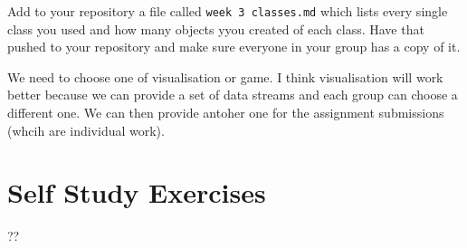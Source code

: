 \documentclass[twoside=false,DIV=14]{scrartcl}
\begin{document}
Add to your repository a file called \texttt{week 3 classes.md} which lists every single class you used and how many objects yyou created of each class.  Have that pushed to your repository and make sure everyone in your group has a copy of it.

\begin{todo}
    We need to choose one of visualisation or game.  I think visualisation will work better because we can provide a set of data streams and each group can choose a different one. We can then provide antoher one for the assignment submissions (whcih are individual work).
\end{todo}
\newpage
\part*{Self Study Exercises}
??
\end{document}
